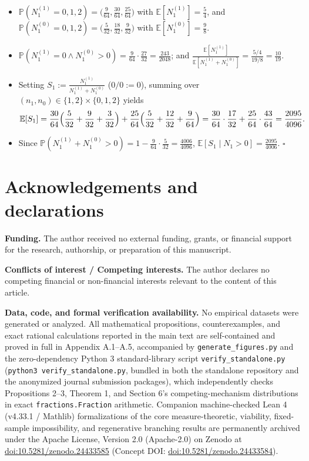 \documentclass[11pt,a4paper]{article}
\providecommand{\tightlist}{\setlength{\itemsep}{2pt}\setlength{\parskip}{0pt}}
\begin{document}
\begin{itemize}
\tightlist
\item
  \(\mathbb{P}(N_1^{(1)} = 0,1,2) = \bigl(\frac{9}{64}, \frac{30}{64}, \frac{25}{64}\bigr)\)
  with \(\mathbb{E}[N_1^{(1)}] = \frac{5}{4}\), and
  \(\mathbb{P}(N_1^{(0)} = 0,1,2) = \bigl(\frac{5}{32}, \frac{18}{32}, \frac{9}{32}\bigr)\)
  with \(\mathbb{E}[N_1^{(0)}] = \frac{9}{8}\).
\item
  \(\mathbb{P}(N_1^{(1)} = 0 \land N_1^{(0)} > 0) = \frac{9}{64} \cdot \frac{27}{32} = \frac{243}{2048}\);
  and
  \(\frac{\mathbb{E}[N_1^{(1)}]}{\mathbb{E}[N_1^{(1)} + N_1^{(0)}]} = \frac{5/4}{19/8} = \frac{10}{19}\).
\item
  Setting \(S_1 := \frac{N_1^{(1)}}{N_1^{(1)} + N_1^{(0)}}\)
  (\(0/0 := 0\)), summing over
  \((n_1, n_0) \in \{1,2\} \times \{0,1,2\}\) yields
  \[\mathbb{E}[S_1] = \frac{30}{64}\Bigl(\frac{5}{32} + \frac{9}{32} + \frac{3}{32}\Bigr) + \frac{25}{64}\Bigl(\frac{5}{32} + \frac{12}{32} + \frac{9}{64}\Bigr) = \frac{30}{64}\cdot\frac{17}{32} + \frac{25}{64}\cdot\frac{43}{64} = \frac{2095}{4096}.\]
\item
  Since
  \(\mathbb{P}(N_1^{(1)} + N_1^{(0)} > 0) = 1 - \frac{9}{64}\cdot\frac{5}{32} = \frac{4006}{4096}\),
  \(\mathbb{E}[S_1 \mid N_1 > 0] = \frac{2095}{4006}\). \(\square\)
\end{itemize}

\section*{Acknowledgements and
declarations}\label{acknowledgements-and-declarations}

\textbf{Funding.} The author received no external funding, grants, or
financial support for the research, authorship, or preparation of this
manuscript.

\textbf{Conflicts of interest / Competing interests.} The author
declares no competing financial or non-financial interests relevant to
the content of this article.

\textbf{Data, code, and formal verification availability.} No empirical
datasets were generated or analyzed. All mathematical propositions,
counterexamples, and exact rational calculations reported in the main
text are self-contained and proved in full in Appendix A.1--A.5,
accompanied by \texttt{generate\_figures.py} and the zero-dependency
Python 3 standard-library script \texttt{verify\_standalone.py}
(\texttt{python3\ verify\_standalone.py}, bundled in both the standalone
repository and the anonymized journal submission packages), which
independently checks Propositions 2--3, Theorem 1, and Section 6's
competing-mechanism distributions in exact \texttt{fractions.Fraction}
arithmetic. Companion machine-checked Lean 4 (v4.33.1 / Mathlib)
formalizations of the core measure-theoretic, viability, fixed-sample
impossibility, and regenerative branching results are permanently
archived under the Apache License, Version 2.0 (Apache-2.0) on Zenodo at
\href{https://doi.org/10.5281/zenodo.24433585}{doi:10.5281/zenodo.24433585}
(Concept DOI:
\href{https://doi.org/10.5281/zenodo.24433584}{doi:10.5281/zenodo.24433584}).
\end{document}
